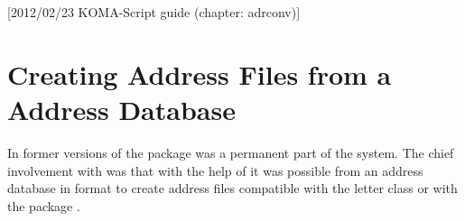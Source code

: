 %
%
%
%
%
%
%
%
% 
%
%
%
%

[2012/02/23 KOMA-Script guide (chapter:
  adrconv)]


\chapter{Creating Address Files from a Address Database}%
%
%
%

In former versions of {\KOMAScript} the package  was
a permanent part of the {\KOMAScript} system.  The chief involvement
with {\KOMAScript} was that with the help of  it was
possible from an address database in {\BibTeX} format to create
address files compatible with the {\KOMAScript} letter class or with
the package .

